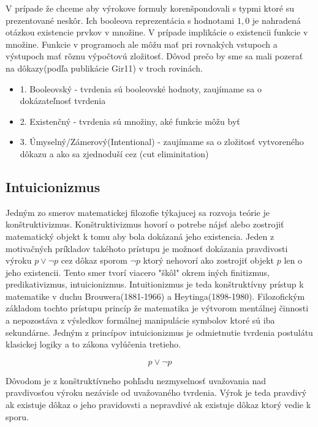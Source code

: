 \documentclass[a4paper,10pt,oneside]{report}%
\begin{document}

V prípade že chceme aby výrokove formuly korenšpondovali s typmi ktoré su prezentované neskôr.
Ich booleova reprezentácia s hodnotami $1,0$ je nahradená otázkou existencie prvkov v množine.
V prípade implikácie o existencii funkcie v množine.
Funkcie v programoch ale môžu mať pri rovnakých vstupoch a výstupoch mať rôznu výpočtovú zložitosť.
Dôvod prečo by sme sa mali pozerať na dôkazy(podľa publikácie Gir11) v troch rovinách.

\begin{itemize}
    \item 1. Booleovský - tvrdenia sú booleovské hodnoty, zaujímame sa o dokázateľnosť tvrdenia
    \item 2. Existenčný - tvrdenia sú množiny, aké funkcie môžu byť
    \item 3. Úmyselný/Zámerový(Intentional) - zaujímame sa o zložitosť vytvoreného dôkazu a ako sa zjednoduší cez (cut eliminitation)
\end{itemize}

\subsection{Intuicionizmus}

Jedným zo smerov matematickej filozofie týkajucej sa rozvoja teórie je konštruktivizmus.
Konštruktivizmus hovorí o potrebe nájsť alebo zostrojiť matematický objekt k tomu
    aby bola dokázaná jeho existencia.
Jeden z motivačných príkladov takéhoto prístupu je možnosť dokázania pravdivosti
výroku $p \vee \neg p$ cez dôkaz sporom $\neg p$ ktorý nehovorí ako zostrojiť objekt
$p$ len o jeho existencii.
Tento smer tvorí viacero "škôl" okrem iných finitizmus, predikativizmus, intuicionizmus.
Intuitionizmus je teda konštruktívny prístup k matematike v duchu
    Brouwera(1881-1966) a Heytinga(1898-1980).
Filozofickým základom tochto prístupu princíp že matematika je výtvorom mentálnej
činnosti a nepozostáva z výsledkov  formálnej manipulácie symbolov ktoré sú iba
sekundárne.
Jedným z princípov intuicionizmus je odmietnutie tvrdenia postulátu klasickej
logiky a to zákona vylúčenia tretieho.

\begin{equation}
    p \vee \neg p
\end{equation}

Dôvodom je z konštruktívneho pohľadu nezmyselnosť uvažovania nad pravdivosťou
    výroku nezávisle od uvažovaného tvrdenia.
Výrok je teda pravdivý ak existuje dôkaz o jeho pravidovsti a nepravdivé
    ak existuje dôkaz ktorý vedie k sporu.
\end{document}
